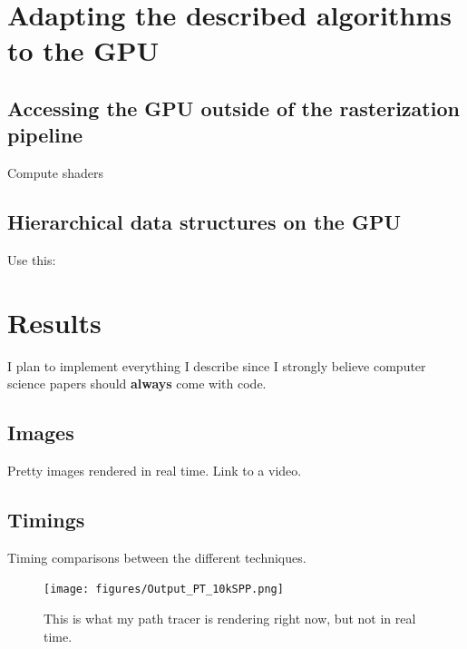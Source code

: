 \documentclass{ACGSeminar}
\begin{document}

\section{Adapting the described algorithms to the GPU}
\subsection{Accessing the GPU outside of the rasterization pipeline}
Compute shaders
\subsection{Hierarchical data structures on the GPU}
Use this: \cite{Karras:2012:MPC:2383795.2383801}

\section{Results}
I plan to implement everything I describe since I strongly believe computer science papers should \textbf{always} come with code.
\subsection{Images}
Pretty images rendered in real time. Link to a video.
\subsection{Timings}
Timing comparisons between the different techniques.


\begin{figure}[htb!]
  \begin{centering}
    \texttt{[image: figures/Output\_PT\_10kSPP.png]}\par
  \end{centering}
  \caption{This is what my path tracer is rendering right now, but not in real time.}
  \label{fig:pathtraced}
\end{figure}


\printbibliography
\cleardoublepage
\end{document}

